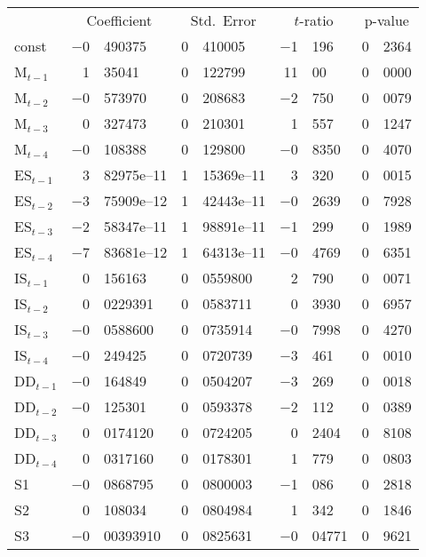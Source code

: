 \documentclass[11pt]{article}
\begin{document}
\begin{center}
\begin{tabular}{lr@{.}lr@{.}lr@{.}lr@{.}l}
  &
 \multicolumn{2}{c}{Coefficient} &
  \multicolumn{2}{c}{Std.\ Error} &
   \multicolumn{2}{c}{$t$-ratio} &
    \multicolumn{2}{c}{p-value} \\[1ex]
const &
  $-$0&490375 &
    0&410005 &
      $-$1&196 &
        0&2364 \\
M$_{t-1}$ &
  1&35041 &
    0&122799 &
      11&00 &
        0&0000 \\
M$_{t-2}$ &
  $-$0&573970 &
    0&208683 &
      $-$2&750 &
        0&0079 \\
M$_{t-3}$ &
  0&327473 &
    0&210301 &
      1&557 &
        0&1247 \\
M$_{t-4}$ &
  $-$0&108388 &
    0&129800 &
      $-$0&8350 &
        0&4070 \\
ES$_{t-1}$ &
  3&82975\textrm{e--11} &
    1&15369\textrm{e--11} &
      3&320 &
        0&0015 \\
ES$_{t-2}$ &
  $-$3&75909\textrm{e--12} &
    1&42443\textrm{e--11} &
      $-$0&2639 &
        0&7928 \\
ES$_{t-3}$ &
  $-$2&58347\textrm{e--11} &
    1&98891\textrm{e--11} &
      $-$1&299 &
        0&1989 \\
ES$_{t-4}$ &
  $-$7&83681\textrm{e--12} &
    1&64313\textrm{e--11} &
      $-$0&4769 &
        0&6351 \\
IS$_{t-1}$ &
  0&156163 &
    0&0559800 &
      2&790 &
        0&0071 \\
IS$_{t-2}$ &
  0&0229391 &
    0&0583711 &
      0&3930 &
        0&6957 \\
IS$_{t-3}$ &
  $-$0&0588600 &
    0&0735914 &
      $-$0&7998 &
        0&4270 \\
IS$_{t-4}$ &
  $-$0&249425 &
    0&0720739 &
      $-$3&461 &
        0&0010 \\
DD$_{t-1}$ &
  $-$0&164849 &
    0&0504207 &
      $-$3&269 &
        0&0018 \\
DD$_{t-2}$ &
  $-$0&125301 &
    0&0593378 &
      $-$2&112 &
        0&0389 \\
DD$_{t-3}$ &
  0&0174120 &
    0&0724205 &
      0&2404 &
        0&8108 \\
DD$_{t-4}$ &
  0&0317160 &
    0&0178301 &
      1&779 &
        0&0803 \\
S1 &
  $-$0&0868795 &
    0&0800003 &
      $-$1&086 &
        0&2818 \\
S2 &
  0&108034 &
    0&0804984 &
      1&342 &
        0&1846 \\
S3 &
  $-$0&00393910 &
    0&0825631 &
      $-$0&04771 &
        0&9621 \\
\end{tabular}


\end{center}
\end{document}
